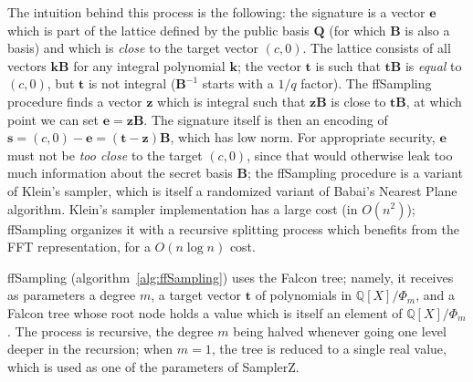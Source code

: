\documentclass{llncs}
\newcommand{\bQ}{\mathbb{Q}}
\begin{document}
The intuition behind this process is the following: the signature is a
vector $\mathbf{e}$ which is part of the lattice defined by the public
basis $\mathbf{Q}$ (for which $\mathbf{B}$ is also a basis) and which is
\emph{close} to the target vector $(c, 0)$. The lattice consists of all
vectors $\mathbf{k} \mathbf{B}$ for any integral polynomial
$\mathbf{k}$; the vector $\mathbf{t}$ is such that $\mathbf{t}
\mathbf{B}$ is \emph{equal} to $(c, 0)$, but $\mathbf{t}$ is not
integral ($\mathbf{B}^{-1}$ starts with a $1/q$ factor). The
\textsf{ffSampling} procedure finds a vector $\mathbf{z}$ which is
integral such that $\mathbf{z} \mathbf{B}$ is close to $\mathbf{t}
\mathbf{B}$, at which point we can set $\mathbf{e} = \mathbf{z}
\mathbf{B}$. The signature itself is then an encoding of $\mathbf{s} =
(c, 0) - \mathbf{e} = (\mathbf{t} - \mathbf{z}) \mathbf{B}$, which has
low norm. For appropriate security, $\mathbf{e}$ must not be \emph{too
close} to the target $(c, 0)$, since that would otherwise leak too much
information about the secret basis $\mathbf{B}$; the \textsf{ffSampling}
procedure is a variant of Klein's sampler\cite{Kle2000}, which is itself
a randomized variant of Babai's Nearest Plane algorithm\cite{Bab1986}.
Klein's sampler implementation has a large cost (in $O(n^2)$);
\textsf{ffSampling} organizes it with a recursive splitting process
which benefits from the FFT representation, for a $O(n\log n)$
cost\cite{DucPre2016}.

\textsf{ffSampling} (algorithm~\ref{alg:ffSampling}) uses the Falcon
tree; namely, it receives as parameters a degree $m$, a target vector
$\mathbf{t}$ of polynomials in $\bQ[X]/\Phi_m$, and a Falcon tree whose
root node holds a value which is itself an element of $\bQ[X]/\Phi_m$.
The process is recursive, the degree $m$ being halved whenever going one
level deeper in the recursion; when $m = 1$, the tree is reduced to a
single real value, which is used as one of the parameters of
\textsf{SamplerZ}.
\end{document}
